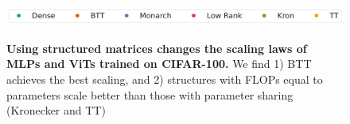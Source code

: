 \documentclass{article}
\theoremstyle{plain}
\theoremstyle{definition}
\theoremstyle{remark}
\begin{document}
\begin{figure}[!t]
\vspace{0mm}
\centering
    \includegraphics[width=0.7\linewidth]{figs/mlp_cifar10_legend.pdf}\\
   \caption{
     \textbf{Using structured matrices changes the scaling laws of MLPs and ViTs trained on CIFAR-100.} We find 1) BTT achieves the best scaling, and 2) structures with FLOPs equal to parameters scale better than those with parameter sharing (Kronecker and TT)
     }
    \label{fig:struct-extended}
    \vspace{-4mm}
\end{figure}
\end{document}
